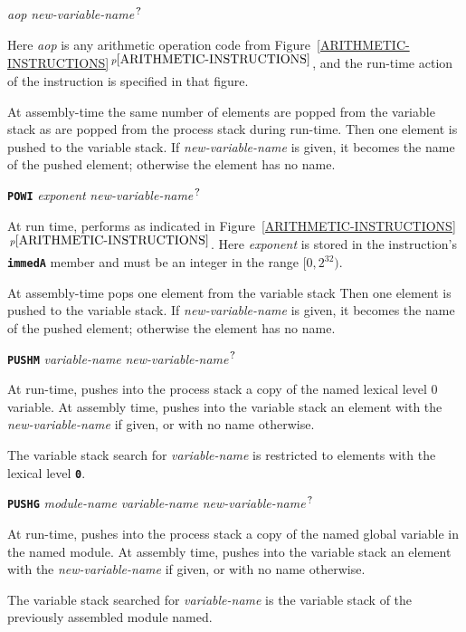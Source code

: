 \documentclass[12pt]{article}
\makeatletter
\newcommand{\TT}[1]{{\tt \bfseries #1}}
\newcommand{\QMARK}{{$^{\,\mbox{\footnotesize ?}}$}}
\newcommand{\ttkey}[1]{\TT{#1}\index{#1@{\tt #1}}}
\newcommand{\itemref}[1]{\ref{#1}$\,^{p\pageref{#1}}$}
\newenvironment{indpar}[1][0.3in]%
	{\begin{list}{}%
		     {\setlength{\itemsep}{0in}%
		      \setlength{\topsep}{0in}%
		      \setlength{\parsep}{1ex}%
		      \setlength{\labelwidth}{#1}%
		      \setlength{\leftmargin}{#1}%
		      \addtolength{\leftmargin}{\labelsep}}%
	 \item}%
	{\end{list}}
\makeatother
\begin{document}
{\em aop} {\em new-variable-name}\QMARK{}
\begin{indpar}
Here {\em aop} is any arithmetic operation code from
Figure~\itemref{ARITHMETIC-INSTRUCTIONS}, and the run-time
action of the instruction is specified in that figure.

At assembly-time the same number of elements are popped from the variable stack
as are popped from the process stack during run-time.
Then one element is pushed to the variable stack.
If {\em new-variable-name} is given, it becomes
the name of the pushed element; otherwise the element has no name.
\end{indpar}

\ttkey{POWI} {\em exponent}
              {\em new-variable-name}\QMARK{}
\begin{indpar}
At run time, performs as indicated in
Figure~\itemref{ARITHMETIC-INSTRUCTIONS}.
Here {\em exponent} is stored in the instruction's \TT{immedA}
member and must be an integer in the range $[0,2^{32})$.

At assembly-time pops one element from the variable stack
Then one element is pushed to the variable stack.
If {\em new-variable-name} is given, it becomes
the name of the pushed element; otherwise the element has no name.
\end{indpar}

\ttkey{PUSHM} {\em variable-name}
              {\em new-variable-name}\QMARK{}
\begin{indpar}
At run-time, pushes into the process stack a copy of the named
lexical level 0 variable.
At assembly time, pushes into the variable stack an
element with the {\em new-variable-name} if given, or 
with no name otherwise.

The variable stack search for {\em variable-name} is restricted to
elements with the lexical level \TT{0}.
\end{indpar}

\ttkey{PUSHG} {\em module-name} {\em variable-name}
              {\em new-variable-name}\QMARK{}
\begin{indpar}
At run-time, pushes into the process stack a copy of the named
global variable in the named module.
At assembly time, pushes into the variable stack an
element with the {\em new-variable-name} if given, or 
with no name otherwise.

The variable stack searched for {\em variable-name} is the variable
stack of the previously assembled module named.
\end{indpar}
\end{document}
